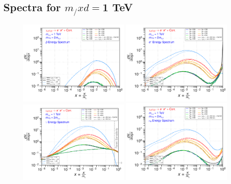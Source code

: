 \documentclass[epj,nopacs,fleqn]{svjour}
\begin{document}
\clearpage
\subsection{Spectra for $m_/xd=$1 TeV}
\begin{figure}[!b]
	\centering
	\subfigure
	{ \includegraphics[width=0.49\textwidth]{Fig/xdxd_ee_eeZ_eveW/1_antiprotons_ee_eeZ_eveW_1.pdf}}
	\subfigure
	{ \includegraphics[width=0.49\textwidth]{Fig/xdxd_ee_eeZ_eveW/1_positrons_ee_eeZ_eveW_1.pdf}}
	\subfigure
	{ \includegraphics[width=0.49\textwidth]{Fig/xdxd_ee_eeZ_eveW/1_gammas_ee_eeZ_eveW_1.pdf}}
	\subfigure
	{ \includegraphics[width=0.49\textwidth]{Fig/xdxd_ee_eeZ_eveW/1_neutrinos_e_ee_eeZ_eveW_1.pdf}}

\end{figure}
\end{document}
